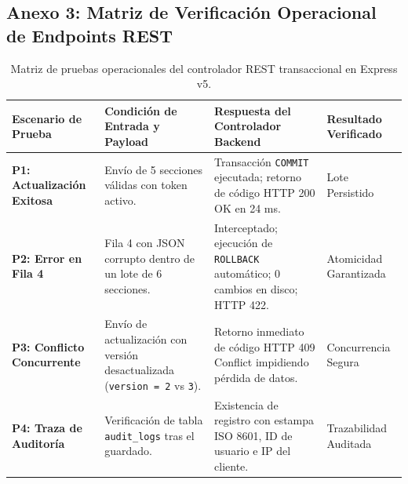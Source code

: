 \documentclass[12pt,a4paper]{article}
\begin{document}
\subsection*{Anexo 3: Matriz de Verificación Operacional de Endpoints REST}
\begin{table}[H]
\centering
\small
\renewcommand{\arraystretch}{1.15}
\begin{tabularx}{\textwidth}{|>{\hsize=0.75\hsize\raggedright\arraybackslash\bfseries\footnotesize}X|>{\hsize=1.25\hsize\raggedright\arraybackslash\footnotesize}X|>{\hsize=1.35\hsize\raggedright\arraybackslash\footnotesize}X|>{\hsize=0.65\hsize\centering\arraybackslash\footnotesize}X|}
\hline
\rowcolor{tableheader}
\textbf{Escenario de Prueba} & \textbf{Condición de Entrada y Payload} & \textbf{Respuesta del Controlador Backend} & \textbf{Resultado Verificado} \\
\hline
P1: Actualización Exitosa & Envío de 5 secciones válidas con token activo. & Transacción \texttt{COMMIT} ejecutada; retorno de código HTTP 200 OK en 24 ms. & Lote Persistido \\
\hline
P2: Error en Fila 4 & Fila 4 con JSON corrupto dentro de un lote de 6 secciones. & Interceptado; ejecución de \texttt{ROLLBACK} automático; 0 cambios en disco; HTTP 422. & Atomicidad Garantizada \\
\hline
P3: Conflicto Concurrente & Envío de actualización con versión desactualizada (\texttt{version = 2} vs \texttt{3}). & Retorno inmediato de código HTTP 409 Conflict impidiendo pérdida de datos. & Concurrencia Segura \\
\hline
P4: Traza de Auditoría & Verificación de tabla \texttt{audit\_\allowbreak  logs} tras el guardado. & Existencia de registro con estampa ISO 8601, ID de usuario e IP del cliente. & Trazabilidad Auditada \\
\hline
\end{tabularx}
\caption{Matriz de pruebas operacionales del controlador REST transaccional en Express v5.}
\end{table}
\end{document}
